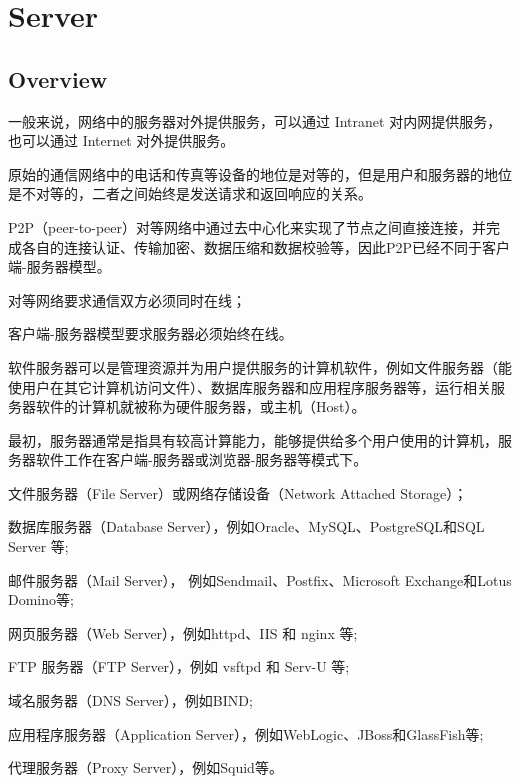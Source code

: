 \part{Server}


\chapter{Overview}


一般来说，网络中的服务器对外提供服务，可以通过 Intranet 对内网提供服务，也可以通过 Internet 对外提供服务。

原始的通信网络中的电话和传真等设备的地位是对等的，但是用户和服务器的地位是不对等的，二者之间始终是发送请求和返回响应的关系。

P2P（peer-to-peer）对等网络中通过去中心化来实现了节点之间直接连接，并完成各自的连接认证、传输加密、数据压缩和数据校验等，因此P2P已经不同于客户端-服务器模型。

\begin{compactitem}
\item 对等网络要求通信双方必须同时在线；
\item 客户端-服务器模型要求服务器必须始终在线。
\end{compactitem}

软件服务器可以是管理资源并为用户提供服务的计算机软件，例如文件服务器（能使用户在其它计算机访问文件）、数据库服务器和应用程序服务器等，运行相关服务器软件的计算机就被称为硬件服务器，或主机（Host）。

最初，服务器通常是指具有较高计算能力，能够提供给多个用户使用的计算机，服务器软件工作在客户端-服务器或浏览器-服务器等模式下。


\begin{compactitem}
\item 文件服务器（File Server）或网络存储设备（Network Attached Storage）；
\item 数据库服务器（Database Server），例如Oracle、MySQL、PostgreSQL和SQL Server 等;
\item 邮件服务器（Mail Server）， 例如Sendmail、Postfix、Microsoft Exchange和Lotus Domino等;
\item 网页服务器（Web Server），例如httpd、IIS 和 nginx 等;
\item FTP 服务器（FTP Server），例如 vsftpd 和 Serv-U 等;
\item 域名服务器（DNS Server），例如BIND;
\item 应用程序服务器（Application Server），例如WebLogic、JBoss和GlassFish等;
\item 代理服务器（Proxy Server），例如Squid等。
\end{compactitem}


